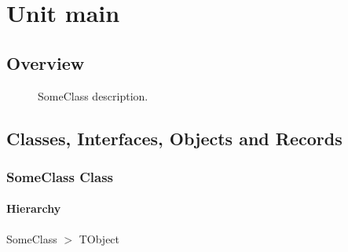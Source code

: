 \documentclass{report}
\newif\ifpdf
\begin{document}
\label{toc}\tableofcontents
\newpage
\newlength{\tmplength}
\chapter{Unit main}
\label{main}
\section{Overview}
\begin{description}
\item[\texttt{\begin{ttfamily}SomeClass\end{ttfamily} Class}]SomeClass description.
\end{description}
\section{Classes, Interfaces, Objects and Records}
\ifpdf
\subsection*{\large{\textbf{SomeClass Class}}\normalsize\hspace{1ex}\hrulefill}
\else
\subsection*{SomeClass Class}
\fi
\label{main.SomeClass}
\subsubsection*{\large{\textbf{Hierarchy}}\normalsize\hspace{1ex}\hfill}
SomeClass {$>$} TObject
\end{document}
